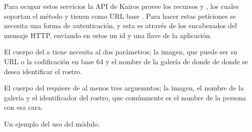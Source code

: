 Para ocupar estos servicios la API de Kairos provee los recursos  y
, los cuales soportan el método  y tienen como
URL base . Para hacer estas peticiones se
necesita una forma de autenticación, y esta es através de los encabezados
del mensaje HTTP, enviando en estos un id y una llave de la aplicación.

El cuerpo del  a  tiene necesita al dos parámetros; la
imagen, que puede ser su URL o la codificación en base 64
y el nombre de la galería de donde de donde se desea identificar el rostro.

\begin{sphinxVerbatim}[commandchars=\\\{\}]
      
      
\end{sphinxVerbatim}

El cuerpo del  requiere de al menos tres arguemntos;
la imagen, el nombre de la galería y el identificador del rostro, que
comúnmente es el nombre de la persona con esa cara.

\begin{sphinxVerbatim}[commandchars=\\\{\}]
      
      
      
\end{sphinxVerbatim}

Un ejemplo del uso del módulo.

